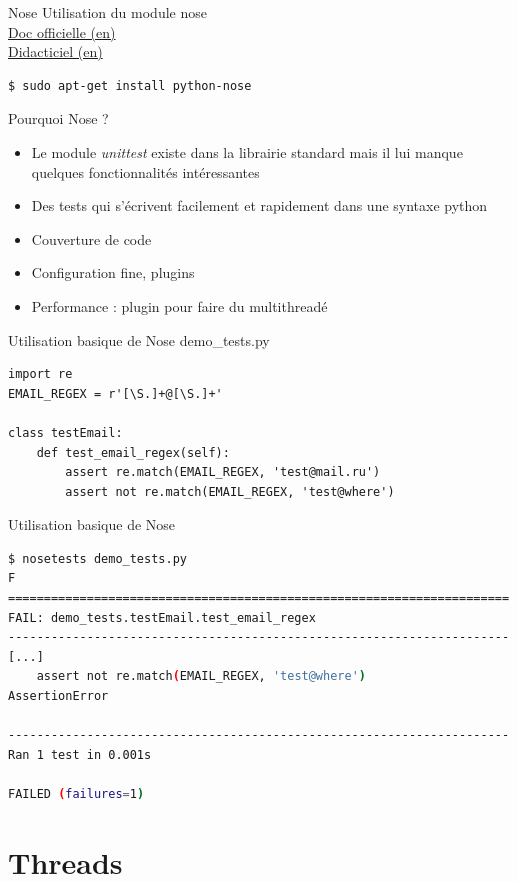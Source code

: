 \documentclass{beamer}
\begin{document}
\begin{frame}[fragile]{Nose}
Utilisation du module nose\\
\href{http://readthedocs.org/docs/nose/en/latest/}{Doc officielle (en)}\\
\href{http://ivory.idyll.org/articles/nose-intro.html}{Didacticiel (en)}
\begin{lstlisting}[language=bash]
$ sudo apt-get install python-nose
\end{lstlisting}
Pourquoi Nose ?
\begin{itemize}
 \item Le module \textit{unittest} existe dans la librairie standard mais il lui manque quelques fonctionnalités intéressantes
 \item Des tests qui s'écrivent facilement et rapidement dans une syntaxe python
 \item Couverture de code
 \item Configuration fine, plugins
 \item Performance : plugin pour faire du multithreadé
\end{itemize}
\end{frame}

\begin{frame}[fragile]{Utilisation basique de Nose}
demo\_tests.py
\begin{lstlisting}
import re
EMAIL_REGEX = r'[\S.]+@[\S.]+'

class testEmail:
    def test_email_regex(self):
        assert re.match(EMAIL_REGEX, 'test@mail.ru')
        assert not re.match(EMAIL_REGEX, 'test@where')
\end{lstlisting}
\end{frame}

\begin{frame}[fragile]{Utilisation basique de Nose}
\begin{lstlisting}[language=bash]
$ nosetests demo_tests.py
F
======================================================================
FAIL: demo_tests.testEmail.test_email_regex
----------------------------------------------------------------------
[...]
    assert not re.match(EMAIL_REGEX, 'test@where')
AssertionError

----------------------------------------------------------------------
Ran 1 test in 0.001s

FAILED (failures=1)
\end{lstlisting}
\end{frame}

\section{Threads}
\end{document}
